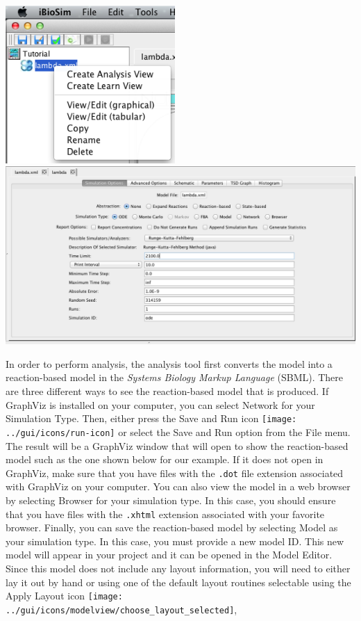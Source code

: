 \documentclass[titlepage,11pt]{article}
\begin{document}
\begin{center}
\includegraphics[height=60mm]{screenshots/GCMAnalysis}\\
\includegraphics[width=160mm]{screenshots/analysisView}
\end{center}

In order to perform analysis, the analysis tool first converts the model into a reaction-based model in the \emph{Systems Biology Markup Language} (SBML).  There are three different ways to see the reaction-based model that is produced.  If GraphViz is installed on your computer, you can select Network for your Simulation Type.  Then, either press the Save and Run icon \texttt{[image: ../gui/icons/run-icon]} or select the Save and Run option from the File menu.  The result will be a GraphViz window that will open to show the reaction-based model such as the one shown below for our example.  If it does not open in GraphViz, make sure that you have files with the {\tt .dot} file extension associated with GraphViz on your computer.  You can also view the model in a web browser by selecting Browser for your simulation type.  In this case, you should ensure that you have files with the {\tt .xhtml} extension associated with your favorite browser.  Finally, you can save the reaction-based model by selecting Model as your simulation type.  In this case, you must provide a new model ID.  This new model will appear in your project and it can be opened in the Model Editor.  Since this model does not include any layout information, you will need to either lay it out by hand or using one of the default layout routines selectable using the Apply Layout icon    \texttt{[image: ../gui/icons/modelview/choose\_layout\_selected]},
\end{document}
